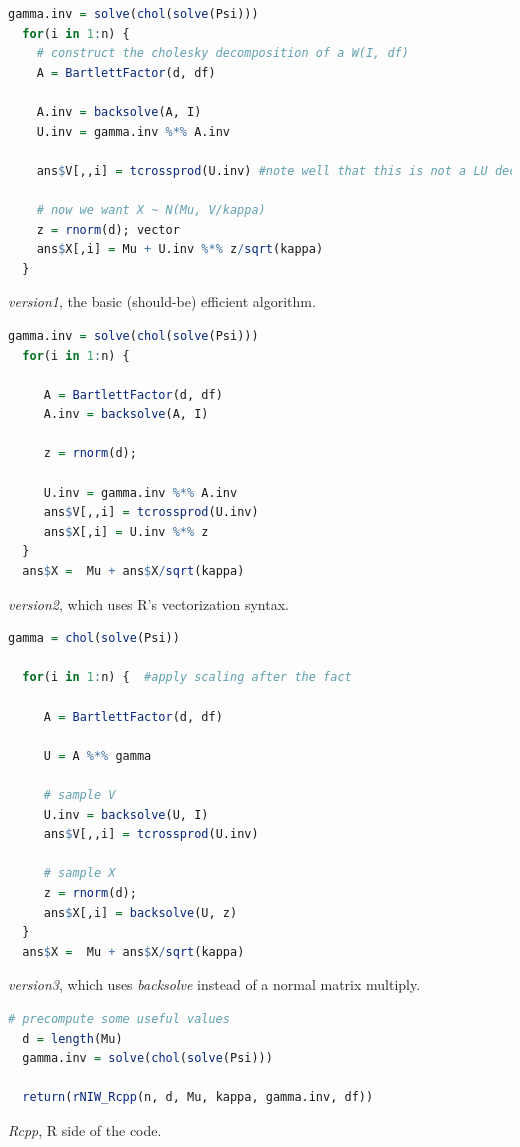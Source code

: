 \documentclass[english]{report}
\begin{document}
\begin{lstlisting}[frame=single, language=R]
  gamma.inv = solve(chol(solve(Psi)))
  for(i in 1:n) {    
    # construct the cholesky decomposition of a W(I, df) 
    A = BartlettFactor(d, df)
    
    A.inv = backsolve(A, I)
    U.inv = gamma.inv %*% A.inv
    
    ans$V[,,i] = tcrossprod(U.inv) #note well that this is not a LU decomposition -- it's UL
    
    # now we want X ~ N(Mu, V/kappa)
    z = rnorm(d); vector
    ans$X[,i] = Mu + U.inv %*% z/sqrt(kappa)
  }
\end{lstlisting}
\emph{version1}, the basic (should-be) efficient algorithm.


\begin{lstlisting}[frame=single, language=R]
  gamma.inv = solve(chol(solve(Psi)))
  for(i in 1:n) {
     
     A = BartlettFactor(d, df)
     A.inv = backsolve(A, I)
     
     z = rnorm(d);
     
     U.inv = gamma.inv %*% A.inv
     ans$V[,,i] = tcrossprod(U.inv)
     ans$X[,i] = U.inv %*% z
  }
  ans$X =  Mu + ans$X/sqrt(kappa) 
\end{lstlisting}
\emph{version2}, which uses R's vectorization syntax.


\begin{lstlisting}[frame=single, language=R]
  gamma = chol(solve(Psi))
  
  for(i in 1:n) {  #apply scaling after the fact
     
     A = BartlettFactor(d, df)
     
     U = A %*% gamma
     
     # sample V
     U.inv = backsolve(U, I) 
     ans$V[,,i] = tcrossprod(U.inv)
     
     # sample X
     z = rnorm(d);
     ans$X[,i] = backsolve(U, z)
  }
  ans$X =  Mu + ans$X/sqrt(kappa) 
\end{lstlisting}
\emph{version3}, which uses \emph{backsolve} instead of a normal matrix multiply.


\begin{lstlisting}[frame=single, language=R]
  # precompute some useful values
  d = length(Mu)
  gamma.inv = solve(chol(solve(Psi)))
    
  return(rNIW_Rcpp(n, d, Mu, kappa, gamma.inv, df))
\end{lstlisting}
\emph{Rcpp}, R side of the code.
\end{document}
